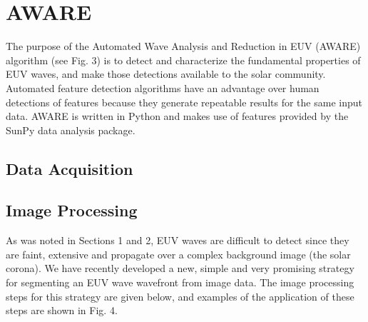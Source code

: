 \section{AWARE}\label{sec:aware}

The purpose of the Automated Wave Analysis and Reduction in EUV (AWARE) algorithm (see Fig. 3) is to detect and characterize the fundamental properties of EUV waves, and make those detections available to the solar community. Automated feature detection algorithms have an advantage over human detections of features because they generate repeatable results for the same input data. AWARE is written in Python and makes use of features provided by the SunPy data analysis package.


\subsection{Data Acquisition}


\subsection{Image Processing}

As was noted in Sections 1 and 2, EUV waves are difficult to detect since they are faint, extensive and propagate over a complex background image (the solar corona).  We have recently developed a new, simple and very promising strategy for segmenting an EUV wave wavefront from image data.  The image processing steps for this strategy are given below, and examples of the application of these steps are shown in Fig. 4.

